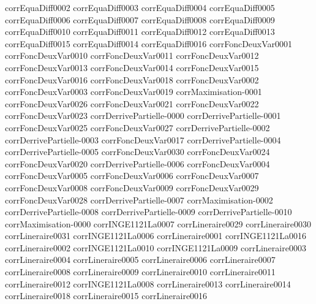 {corrEquaDiff0002}
{corrEquaDiff0003}
{corrEquaDiff0004}
{corrEquaDiff0005}
{corrEquaDiff0006}
{corrEquaDiff0007}
{corrEquaDiff0008}
{corrEquaDiff0009}
{corrEquaDiff0010}
{corrEquaDiff0011}
{corrEquaDiff0012}
{corrEquaDiff0013}
{corrEquaDiff0015}
{corrEquaDiff0014}
{corrEquaDiff0016}
{corrFoncDeuxVar0001}
{corrFoncDeuxVar0010}
{corrFoncDeuxVar0011}
{corrFoncDeuxVar0012}
{corrFoncDeuxVar0013}
{corrFoncDeuxVar0014}
{corrFoncDeuxVar0015}
{corrFoncDeuxVar0016}
{corrFoncDeuxVar0018}
{corrFoncDeuxVar0002}
{corrFoncDeuxVar0003}
{corrFoncDeuxVar0019}
{corrMaximisation-0001}
{corrFoncDeuxVar0026}
{corrFoncDeuxVar0021}
{corrFoncDeuxVar0022}
{corrFoncDeuxVar0023}
{corrDerrivePartielle-0000}
{corrDerrivePartielle-0001}
{corrFoncDeuxVar0025}
{corrFoncDeuxVar0027}
{corrDerrivePartielle-0002}
{corrDerrivePartielle-0003}
{corrFoncDeuxVar0017}
{corrDerrivePartielle-0004}
{corrDerrivePartielle-0005}
{corrFoncDeuxVar0030}
{corrFoncDeuxVar0024}
{corrFoncDeuxVar0020}
{corrDerrivePartielle-0006}
{corrFoncDeuxVar0004}
{corrFoncDeuxVar0005}
{corrFoncDeuxVar0006}
{corrFoncDeuxVar0007}
{corrFoncDeuxVar0008}
{corrFoncDeuxVar0009}
{corrFoncDeuxVar0029}
{corrFoncDeuxVar0028}
{corrDerrivePartielle-0007}
{corrMaximisation-0002}
{corrDerrivePartielle-0008}
{corrDerrivePartielle-0009}
{corrDerrivePartielle-0010}
{corrMaximisation-0000}
{corrINGE1121La0007}
{corrLineraire0029}
{corrLineraire0030}
{corrLineraire0031}
{corrINGE1121La0006}
{corrLineraire0001}
{corrINGE1121La0016}
{corrLineraire0002}
{corrINGE1121La0010}
{corrINGE1121La0009}
{corrLineraire0003}
{corrLineraire0004}
{corrLineraire0005}
{corrLineraire0006}
{corrLineraire0007}
{corrLineraire0008}
{corrLineraire0009}
{corrLineraire0010}
{corrLineraire0011}
{corrLineraire0012}
{corrINGE1121La0008}
{corrLineraire0013}
{corrLineraire0014}
{corrLineraire0018}
{corrLineraire0015}
{corrLineraire0016}
